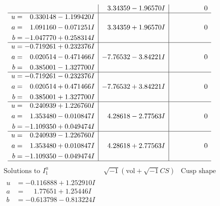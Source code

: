 \documentclass[1p]{elsarticle_modified}
\theoremstyle{definition}
\newcommand{\I}{\sqrt{-1}}
\begin{document}
$$\begin{array}{c|c|c}
 & \phantom{-}3.34359 - 1.96570 I & \phantom{-0.000000 } 0 \\ \hline\begin{aligned}
u &= \phantom{-}0.330148 - 1.199420 I \\
a &= \phantom{-}1.091160 - 0.071251 I \\
b &= -1.047770 + 0.258314 I\end{aligned}
 & \phantom{-}3.34359 + 1.96570 I & \phantom{-0.000000 } 0 \\ \hline\begin{aligned}
u &= -0.719261 + 0.232376 I \\
a &= \phantom{-}0.020514 - 0.471466 I \\
b &= \phantom{-}0.385001 - 1.327700 I\end{aligned}
 & -7.76532 - 3.84221 I & \phantom{-0.000000 } 0 \\ \hline\begin{aligned}
u &= -0.719261 - 0.232376 I \\
a &= \phantom{-}0.020514 + 0.471466 I \\
b &= \phantom{-}0.385001 + 1.327700 I\end{aligned}
 & -7.76532 + 3.84221 I & \phantom{-0.000000 } 0 \\ \hline\begin{aligned}
u &= \phantom{-}0.240939 + 1.226760 I \\
a &= \phantom{-}1.353480 - 0.010847 I \\
b &= -1.109350 + 0.049474 I\end{aligned}
 & \phantom{-}4.28618 - 2.77563 I & \phantom{-0.000000 } 0 \\ \hline\begin{aligned}
u &= \phantom{-}0.240939 - 1.226760 I \\
a &= \phantom{-}1.353480 + 0.010847 I \\
b &= -1.109350 - 0.049474 I\end{aligned}
 & \phantom{-}4.28618 + 2.77563 I & \phantom{-0.000000 } 0\\
 \hline 
 \end{array}$$\newpage$$\begin{array}{c|c|c}  
\text{Solutions to }I^u_{1}& \I (\text{vol} + \sqrt{-1}CS) & \text{Cusp shape}\\
 \hline 
\begin{aligned}
u &= -0.116888 + 1.252910 I \\
a &= \phantom{-}1.77651 + 1.25446 I \\
b &= -0.613798 - 0.813224 I\end{aligned}

\end{array}$$
\end{document}
